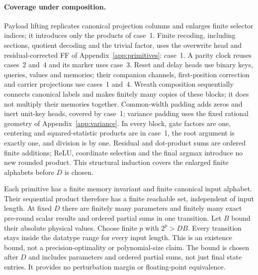 \documentclass[10pt]{article}
\theoremstyle{remark}
\begin{document}
\paragraph{Coverage under composition.}
Payload lifting replicates canonical projection columns and enlarges finite
selector indices; it introduces only the products of case~1. Finite recoding,
including sections, quotient decoding and the trivial factor, uses the overwrite
head and residual-corrected FF of Appendix~\ref{app:primitives}: case~1.
A parity clock reuses cases~2 and~4 and its marker uses case~3. Reset and delay
heads use binary keys, queries, values and memories; their companion channels,
first-position correction and carrier projections use cases~1 and~4.
Wreath composition sequentially connects canonical labels and makes finitely
many copies of these blocks; it does not multiply their memories together.
Common-width padding adds zeros and inert unit-key heads, covered by case~1;
variance padding uses the fixed rational geometry of Appendix~\ref{app:variance}.
In every block, gate factors are one, centering and squared-statistic products
are in case~1, the root argument is exactly one, and division is by one. Residual
and dot-product sums are ordered finite additions; ReLU, coordinate selection
and the final argmax introduce no new rounded product. This structural induction
covers the enlarged finite alphabets before $D$ is chosen.

Each primitive has a finite
memory invariant and finite canonical input alphabet. Their sequential product
therefore has a finite reachable set, independent of input length. At fixed
$D$ there are finitely many parameters and finitely many exact pre-round scalar
results and ordered partial sums in one transition. Let $B$ bound their absolute
physical values. Choose finite $p$ with $2^p>DB$. Every transition stays inside
the datatype range for every input length. This is an existence bound, not a
precision-optimality or polynomial-size claim. The bound is chosen after $D$
and includes parameters and ordered partial sums, not just final state entries.
It provides no perturbation margin or floating-point equivalence.
\end{document}
